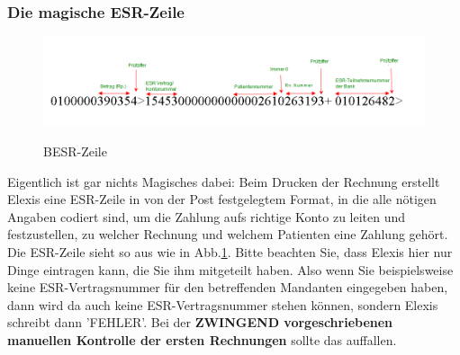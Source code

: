 \documentclass[a4paper]{scrartcl}
\begin{document}
\subsubsection{Die magische ESR-Zeile}
\label{esrline}
\begin{figure}
  \includegraphics[width=1.0\textwidth]{abr19}\\
  \caption{BESR-Zeile}\label{fig:abr19}
\end{figure}

Eigentlich ist gar nichts Magisches dabei: Beim Drucken der Rechnung erstellt Elexis eine ESR-Zeile in von der Post festgelegtem Format, in die alle nötigen Angaben codiert sind, um die Zahlung aufs richtige Konto zu leiten und festzustellen, zu welcher Rechnung und welchem Patienten eine Zahlung gehört. Die ESR-Zeile sieht so aus wie in Abb.\ref{fig:abr19}. Bitte beachten Sie, dass Elexis hier nur Dinge eintragen kann, die Sie ihm mitgeteilt haben. Also wenn Sie beispielsweise keine ESR-Vertragsnummer für den betreffenden Mandanten eingegeben haben, dann wird da auch keine ESR-Vertragsnummer stehen können, sondern Elexis schreibt dann 'FEHLER'. Bei der \textbf{ZWINGEND vorgeschriebenen manuellen Kontrolle der ersten Rechnungen} sollte das auffallen.

\medskip
\end{document}
